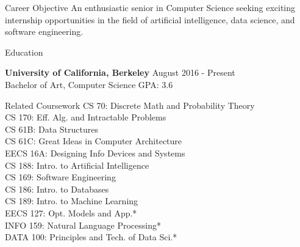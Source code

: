\documentclass{resume} %
\begin{document}

\begin{rSection}{Career Objective}
An enthusiastic senior in Computer Science seeking exciting internship opportunities in the field of artificial
intelligence, data science, and software engineering.
\end{rSection}


\begin{rSection}{Education}

{\bf University of California, Berkeley} \hfill {August 2016 - Present} 
\\ Bachelor of Art, Computer Science \hfill{GPA: 3.6}

\end{rSection}


\begin{rSection2}{Related Coursework}
CS 70: Discrete Math and Probability Theory
\\ CS 170: Eff. Alg. and Intractable Problems
\\ CS 61B: Data Structures
\\ CS 61C: Great Ideas in Computer Architecture
\\ EECS 16A: Designing Info Devices and Systems
\\ CS 188: Intro. to Artificial Intelligence
\\ CS 169: Software Engineering
\\ CS 186: Intro. to Databases
\\ CS 189: Intro. to Machine Learning
\\ EECS 127: Opt. Models and App.*
\\ INFO 159: Natural Language Processing*
\\ DATA 100: Principles and Tech. of Data Sci.*
\end{rSection2}

\end{document}
